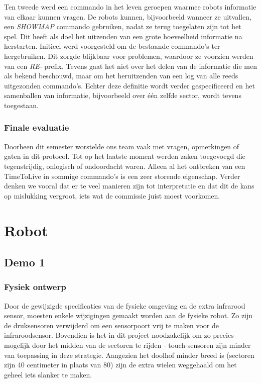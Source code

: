 \documentclass[12pt,a4paper]{report}
\begin{document}
Ten tweede werd een commando in het leven geroepen waarmee robots informatie van elkaar kunnen vragen. De robots kunnen, bijvoorbeeld wanneer ze uitvallen, een \emph{SHOWMAP} commando gebruiken, nadat ze terug toegelaten zijn tot het spel. Dit heeft als doel het uitzenden van een grote hoeveelheid informatie na herstarten. Initieel werd voorgesteld om de bestaande commando's ter hergebruiken. Dit zorgde blijkbaar voor problemen, waardoor ze voorzien werden van een \emph{RE-} prefix. Tevens gaat het niet over het delen van de informatie die men als bekend beschouwd, maar om het heruitzenden van een log van alle reeds uitgezonden commando's. Echter deze definitie wordt verder gespecificeerd en het samenballen van informatie, bijvoorbeeld over \'e\'en zelfde sector, wordt tevens toegestaan.

\subsection{Finale evaluatie}

Doorheen dit semester worstelde ons team vaak met vragen, opmerkingen of gaten in dit protocol. Tot op het laatste moment werden zaken toegevoegd die tegenstrijdig, onlogisch of ondoordacht waren.
Alleen al het ontbreken van een TimeToLive in sommige commando's is een zeer storende eigenschap. Verder denken we vooral dat er te veel manieren zijn tot interpretatie en dat dit de kans op mislukking vergroot, iets wat de commissie juist moest voorkomen.

\chapter{Robot}

\section{Demo 1}

\subsection{Fysiek ontwerp}

Door de gewijzigde specificaties van de fysieke omgeving en de extra infrarood sensor, moesten enkele wijzigingen gemaakt worden aan de fysieke robot. Zo zijn de druksensoren verwijderd om een sensorpoort vrij te maken voor de infraroodsensor. Bovendien is het in dit project noodzakelijk om zo precies mogelijk door het midden van de sectoren te rijden - touch-sensoren zijn minder van toepassing in deze strategie. Aangezien het doolhof minder breed is (sectoren zijn 40 centimeter in plaats van 80) zijn de extra wielen weggehaald om het geheel iets slanker te maken.
\end{document}
